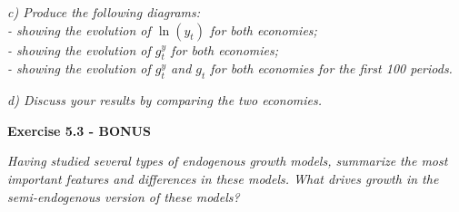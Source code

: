 \documentclass[11pt]{article} %
\begin{document}
\pagebreak
\textit{c) Produce the following diagrams:\\
- showing the evolution of $\ln(y_t)$ for both economies;\\
- showing the evolution of $g_t^y$ for both economies;\\
- showing the evolution of $g_t^y$ and $g_t$ for both economies for the first 100 periods.}




\pagebreak
\textit{d) Discuss your results by comparing the two economies.}




\pagebreak
\textbf{\Large{Exercise 5.3 - BONUS}}

\textit{Having studied several types of endogenous growth models, summarize the most important features and differences in these models. What drives growth in the semi-endogenous version of these models?}
\end{document}

